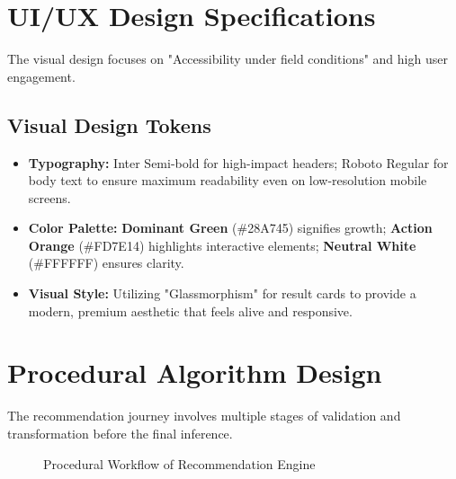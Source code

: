 \documentclass[12pt,a4paper]{report}
\begin{document}
\section{UI/UX Design Specifications}
\label{sec:4.8}
The visual design focuses on "Accessibility under field conditions" and high user engagement.

\subsection{Visual Design Tokens}
\begin{itemize}
    \item \textbf{Typography:} Inter Semi-bold for high-impact headers; Roboto Regular for body text to ensure maximum readability even on low-resolution mobile screens.
    \item \textbf{Color Palette:} \textbf{Dominant Green} (\#28A745) signifies growth; \textbf{Action Orange} (\#FD7E14) highlights interactive elements; \textbf{Neutral White} (\#FFFFFF) ensures clarity.
    \item \textbf{Visual Style:} Utilizing "Glassmorphism" for result cards to provide a modern, premium aesthetic that feels alive and responsive.
\end{itemize}

\section{Procedural Algorithm Design}
\label{sec:4.9}
The recommendation journey involves multiple stages of validation and transformation before the final inference.

\begin{figure}[H]
    \centering
    \caption{Procedural Workflow of Recommendation Engine}
\end{figure}
\end{document}
